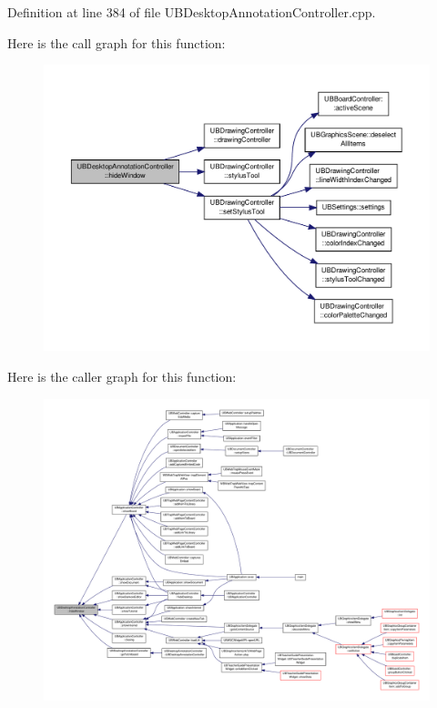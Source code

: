 Definition at line 384 of file U\-B\-Desktop\-Annotation\-Controller.\-cpp.



Here is the call graph for this function\-:
\nopagebreak
\begin{figure}[H]
\begin{center}
\leavevmode
\includegraphics[width=350pt]{d7/db7/class_u_b_desktop_annotation_controller_a1f3515627f629611f3fbec84bf4cec15_cgraph}
\end{center}
\end{figure}




Here is the caller graph for this function\-:
\nopagebreak
\begin{figure}[H]
\begin{center}
\leavevmode
\includegraphics[width=350pt]{d7/db7/class_u_b_desktop_annotation_controller_a1f3515627f629611f3fbec84bf4cec15_icgraph}
\end{center}
\end{figure}


